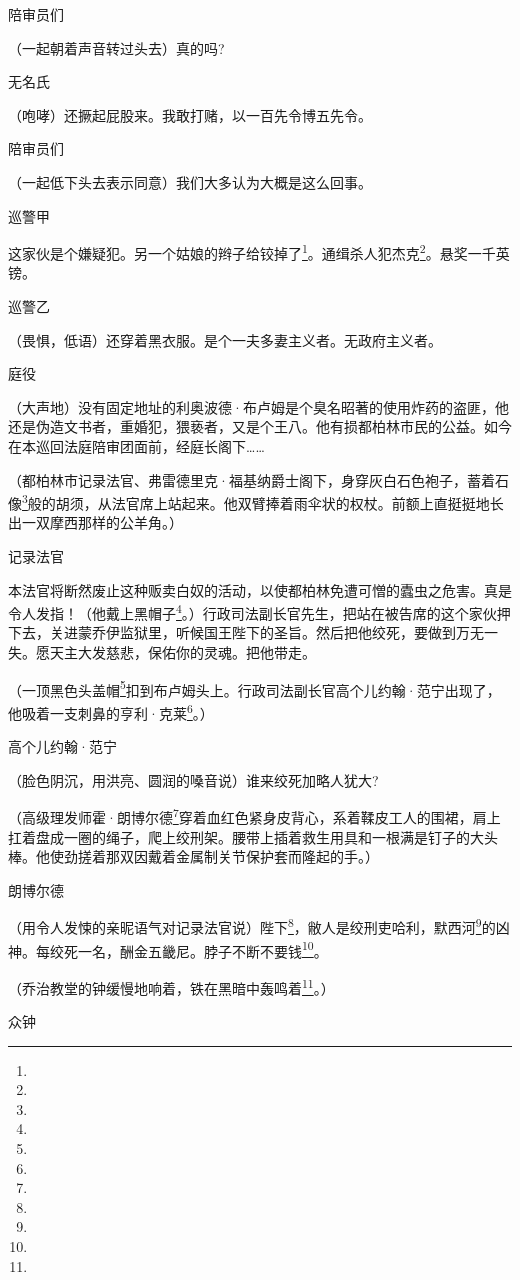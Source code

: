 \par 陪审员们
\par （一起朝着声音转过头去）真的吗?
\par 无名氏
\par （咆哮）还撅起屁股来。我敢打赌，以一百先令博五先令。
\par 陪审员们
\par （一起低下头去表示同意）我们大多认为大概是这么回事。
\par 巡警甲
\par 这家伙是个嫌疑犯。另一个姑娘的辫子给铰掉了\footnote{}。通缉杀人犯杰克\footnote{}。悬奖一千英镑。
\par 巡警乙
\par （畏惧，低语）还穿着黑衣服。是个一夫多妻主义者。无政府主义者。
\par 庭役
\par （大声地）没有固定地址的利奥波德·布卢姆是个臭名昭著的使用炸药的盗匪，他还是伪造文书者，重婚犯，猥亵者，又是个王八。他有损都柏林市民的公益。如今在本巡回法庭陪审团面前，经庭长阁下……
\par （都柏林市记录法官、弗雷德里克·福基纳爵士阁下，身穿灰白石色袍子，蓄着石像\footnote{}般的胡须，从法官席上站起来。他双臂捧着雨伞状的权杖。前额上直挺挺地长出一双摩西那样的公羊角。）
\par 记录法官
\par 本法官将断然废止这种贩卖白奴的活动，以使都柏林免遭可憎的蠹虫之危害。真是令人发指！（他戴上黑帽子\footnote{}。）行政司法副长官先生，把站在被告席的这个家伙押下去，关进蒙乔伊监狱里，听候国王陛下的圣旨。然后把他绞死，要做到万无一失。愿天主大发慈悲，保佑你的灵魂。把他带走。
\par （一顶黑色头盖帽\footnote{}扣到布卢姆头上。行政司法副长官高个儿约翰·范宁出现了，他吸着一支刺鼻的亨利·克莱\footnote{}。）
\par 高个儿约翰·范宁
\par （脸色阴沉，用洪亮、圆润的嗓音说）谁来绞死加略人犹大?
\par （高级理发师霍·朗博尔德\footnote{}穿着血红色紧身皮背心，系着鞣皮工人的围裙，肩上扛着盘成一圈的绳子，爬上绞刑架。腰带上插着救生用具和一根满是钉子的大头棒。他使劲搓着那双因戴着金属制关节保护套而隆起的手。）
\par 朗博尔德
\par （用令人发悚的亲昵语气对记录法官说）陛下\footnote{}，敝人是绞刑吏哈利，默西河\footnote{}的凶神。每绞死一名，酬金五畿尼。脖子不断不要钱\footnote{}。
\par （乔治教堂的钟缓慢地响着，铁在黑暗中轰鸣着\footnote{}。）
\par 众钟
